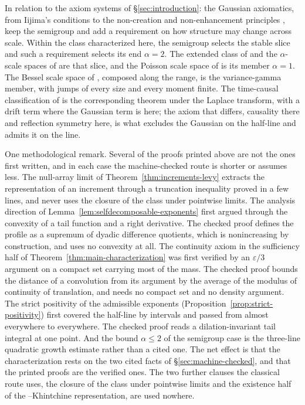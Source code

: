 In relation to the axiom systems of \S\ref{sec:introduction}: the Gaussian axiomatics,
from Iijima's conditions  to the non-creation
and non-enhancement principles , keep
the semigroup and add a requirement on how structure may change across scale. Within the
class characterized here, the semigroup selects the stable slice and such a requirement
selects its end $\alpha = 2$. The extended class of  and the
$\alpha$-scale spaces of  are that slice, and the Poisson scale
space of  is its member $\alpha = 1$. The Bessel scale space of
, composed along the range, is the variance-gamma member, with jumps of
every size and every moment finite. The time-causal classification of
 is the corresponding theorem under the Laplace transform,
with a drift term where the Gaussian term is here; the axiom that differs, causality there
and reflection symmetry here, is what excludes the Gaussian on the half-line and admits it
on the line.

One methodological remark. Several of the proofs printed above are not the ones first written, and in
each case the machine-checked route is shorter or assumes less. The null-array limit of
Theorem~\ref{thm:increments-levy} extracts the representation of an increment through a
truncation inequality proved in a few lines, and never uses the closure of the class under
pointwise limits. The analysis direction of Lemma~\ref{lem:selfdecomposable-exponents} first
argued through the convexity of a tail function and a right derivative. The checked proof
defines the profile as a supremum of dyadic difference quotients, which is nonincreasing by
construction, and uses no convexity at all. The continuity axiom in the sufficiency half of
Theorem~\ref{thm:main-characterization} was first verified by an $\varepsilon/3$ argument on
a compact set carrying most of the mass. The checked proof bounds the distance of a
convolution from its argument by the average of the modulus of continuity of translation,
and needs no compact set and no density argument. The strict positivity of the admissible
exponents (Proposition~\ref{prop:strict-positivity}) first covered the half-line by
intervals and passed from almost everywhere to everywhere. The checked proof reads a
dilation-invariant tail integral at one point. And the bound $\alpha \le 2$ of the
semigroup case is the three-line quadratic growth estimate rather than a cited one. The net
effect is that the characterization rests on the two cited facts of
\S\ref{sec:machine-checked}, and that the printed proofs are the verified ones. The two
further clauses the classical route uses, the closure of the class under pointwise limits
and the existence half of the \Levy--Khintchine representation, are used nowhere.

